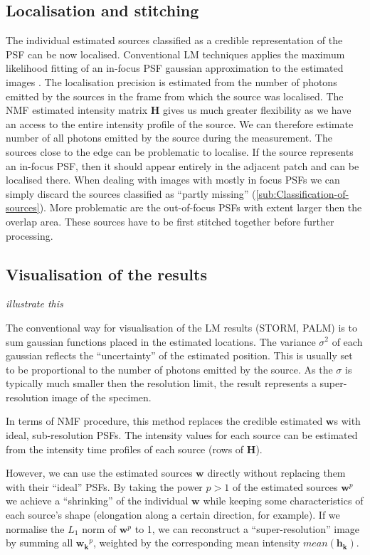 \subsection{Localisation and stitching\label{sub:Localisation-and-stitching}}
The individual estimated sources classified as a credible representation of the PSF can be now localised. Conventional LM techniques applies the maximum likelihood fitting of an in-focus PSF gaussian approximation to the estimated images \cite{Hess2006}. The localisation precision is estimated from the number of photons emitted by the sources in the frame from which the source was localised. The NMF estimated intensity matrix $\bm{H}$ gives us much greater flexibility as we have an access to the entire intensity profile of the source. We can therefore estimate number of all photons emitted by the source during the measurement. The sources close to the edge can be problematic to localise. If the source represents an in-focus PSF, then it should appear entirely in the adjacent patch and can be localised there. When dealing with images with mostly in focus PSFs we can simply discard the sources classified as ``partly missing'' (\autoref{sub:Classification-of-sources}). More problematic are the out-of-focus PSFs with extent larger then the overlap area. These sources have to be first stitched together before further processing.


\subsection{Visualisation of the results\label{sub:visualisation}}
\fix \emph{illustrate this}

The conventional way for visualisation of the LM results (STORM, PALM) is to sum gaussian functions placed in the estimated locations. The variance $\sigma^{2}$ of each gaussian reflects the ``uncertainty'' of the estimated position. This is usually set to be proportional to the number of photons emitted by the source. As the $\sigma$ is typically much smaller then the resolution limit, the result represents a super-resolution image of the specimen. 
	
In terms of NMF procedure, this method replaces the credible estimated $\bm{w}$s with ideal, sub-resolution PSFs. The intensity values for each source can be estimated from the intensity time profiles of each source (rows of $\bm{H}$). 	

However, we can use the estimated sources $\bm{w}$ directly without replacing them with their ``ideal'' PSFs. By taking the power $p>1$ of the estimated sources $\bm{w}^{p}$ we achieve a ``shrinking'' of the individual $\bm{w}$ while keeping some characteristics of each source's shape (elongation along a certain direction, for example). If we normalise the $L_{1}$ norm of $\bm{w}^{p}$ to 1, we can reconstruct a ``super-resolution'' image by summing all $\bm{w_{k}}^{p}$, weighted by the corresponding mean intensity $\unit{mean}(\bm{h_{k}})$.

